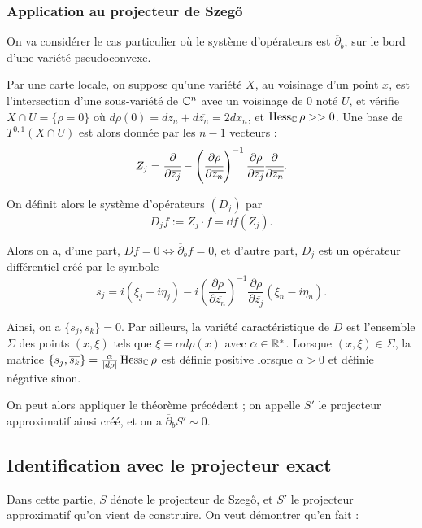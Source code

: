 \subsubsection{Application au projecteur de Szeg\H{o}}
On va considérer le cas particulier où le système d'opérateurs est $\overline{\partial}_b$, sur le bord d'une variété pseudoconvexe.

Par une carte locale, on suppose qu'une variété $X$, au voisinage d'un point $x$, est l'intersection d'une sous-variété de $\mathbb{C}^n$ avec un voisinage de $0$ noté $U$, et vérifie $X \cap U=\{\rho=0\}$ où $d\rho(0)=dz_n + d\overline{z_n} = 2dx_n$, et $\operatorname{Hess}_{\mathbb{C}}\rho >>0$. Une base de $T^{0,1}(X\cap U)$ est alors donnée par les $n-1$ vecteurs :
\begin{equation*}
  Z_j = \cfrac{\partial}{\partial \overline{z_j}} - \left(\cfrac{\partial \rho}{\partial \overline{z_n}}\right)^{-1} \cfrac{\partial \rho}{\partial \overline{z_j}} \cfrac{\partial}{\partial \overline{z_n}}.
\end{equation*}

\noindent On définit alors le système d'opérateurs $(D_j)$ par 
\begin{equation*}
  D_jf := Z_j\cdot f = \dd f(Z_j).
\end{equation*}

Alors on a, d'une part, $Df = 0 \Leftrightarrow \overline{\partial}_bf = 0$, et d'autre part, $D_j$ est un opérateur différentiel créé par le symbole 
\begin{equation*}
  s_j = i(\xi_j - i \eta_j) - i\left(\frac{\partial \rho}{\partial \overline{z_n}}\right)^{-1}\frac{\partial \rho}{\partial \overline{z_j}}(\xi_n - i \eta_n).
\end{equation*}

\noindent Ainsi, on a $\{s_j, s_k\}=0$. Par ailleurs, la variété caractéristique de $D$ est l'ensemble $\Sigma$ des points $(x,\xi)$ tels que $\xi = \alpha d\rho(x)$ avec $\alpha \in \mathbb{R}^*$. Lorsque $(x,\xi)\in \Sigma$, la matrice $\{s_j, \overline{s_k}\} = \frac{\alpha}{|d\rho|}\operatorname{Hess}_{\mathbb{C}}\rho$ est définie positive lorsque $\alpha > 0$ et définie négative sinon.

On peut alors appliquer le théorème précédent ; on appelle $S'$ le projecteur approximatif ainsi créé, et on a $\overline{\partial}_bS'\sim0$.

\subsection{Identification avec le projecteur exact}
Dans cette partie, $S$ dénote le projecteur de Szeg\H{o}, et $S'$ le projecteur approximatif qu'on vient de construire. On veut démontrer qu'en fait :

